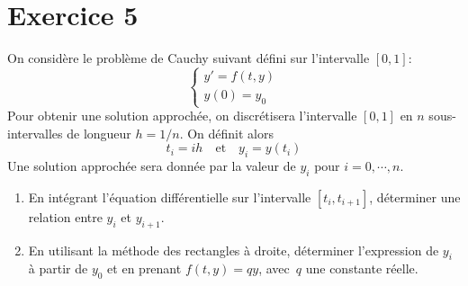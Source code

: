 \documentclass[10pt]{article}
\begin{document}
\section*{Exercice 5}
On considère le problème de Cauchy suivant défini sur l'intervalle $[0,1]$: 
    \[
    \begin{cases}
        y' = f(t,y) \\
        y(0) = y_0
    \end{cases}
    \]
    Pour obtenir une solution approchée, on discrétisera l'intervalle $[0,1]$ en $n$ sous-intervalles de longueur $h=1/n$.\newline 
    On définit alors 
    \[
    t_i = i h \quad \text{et} \quad y_i = y(t_i)
    \]
    Une solution approchée sera donnée par la valeur de $y_i$ pour $i=0, \cdots, n$.
    \begin{enumerate}
        \item En intégrant l'équation différentielle sur l'intervalle $[t_i, t_{i+1}]$, déterminer une relation entre $y_{i}$ et $y_{i+1}$.
        \item En utilisant la méthode des rectangles à droite, déterminer l'expression de $y_i$ à partir de $y_0$ et en prenant $f(t, y) = q y$, avec~$q$ une constante réelle.
    \end{enumerate}
\end{document}
